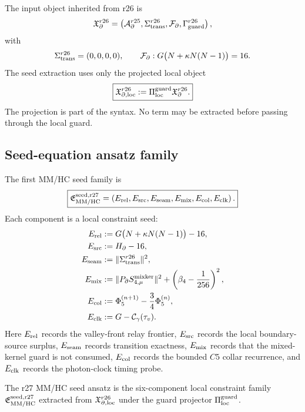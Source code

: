 The input object inherited from r26 is
\[
\mathfrak X_{\partial}^{r26}
=
\left(
\mathcal A_{\partial}^{r25},
\Sigma_{\rm trans}^{r26},
\mathcal F_{\partial},
\Gamma_{\rm guard}^{r26}
\right),
\]
with
\[
\Sigma_{\rm trans}^{r26}=(0,0,0,0),
\qquad
\mathcal F_{\partial}:G\bigl(N+\kappa N(N-1)\bigr)=16.
\]
The seed extraction uses only the projected local object
\[
\boxed{
\mathfrak X_{\partial,\rm loc}^{r26}
:=
\Pi_{\rm loc}^{\rm guard}\mathfrak X_{\partial}^{r26}.
}
\]
The projection is part of the syntax.  No term may be extracted before passing
through the local guard.

\subsection{Seed-equation ansatz family}
\label{subsec:v470-r27-seed-equation-ansatz-family}

The first MM/HC seed family is
\[
\boxed{
\mathfrak E_{\rm MM/HC}^{\rm seed,r27}
=
\left(
E_{\rm rel},
E_{\rm src},
E_{\rm seam},
E_{\rm mix},
E_{\rm col},
E_{\rm clk}
\right).
}
\]
Each component is a local constraint seed:
\[
\begin{aligned}
E_{\rm rel}&:=G\bigl(N+\kappa N(N-1)\bigr)-16,\\
E_{\rm src}&:=H_{\partial}-16,\\
E_{\rm seam}&:=\|\Sigma_{\rm trans}^{r26}\|^2,\\
E_{\rm mix}&:=\|P_{\partial}S_{4,\mu}^{\rm mixker}\|^2+\left(\beta_4-\frac1{256}\right)^2,\\
E_{\rm col}&:=\Phi_5^{(n+1)}-\frac34\Phi_5^{(n)},\\
E_{\rm clk}&:=G-\mathcal C_{\gamma}(\tau_v).
\end{aligned}
\]
Here \(E_{\rm rel}\) records the valley-front relay frontier, \(E_{\rm src}\)
records the local boundary-source surplus, \(E_{\rm seam}\) records transition
exactness, \(E_{\rm mix}\) records that the mixed-kernel guard is not consumed,
\(E_{\rm col}\) records the bounded \(C5\) collar recurrence, and
\(E_{\rm clk}\) records the photon-clock timing probe.

\begin{definition}
\label{def:v470-r27-mmhc-seed-ansatz}
The r27 MM/HC seed ansatz is the six-component local constraint family
\(\mathfrak E_{\rm MM/HC}^{\rm seed,r27}\) extracted from
\(\mathfrak X_{\partial,\rm loc}^{r26}\) under the guard projector
\(\Pi_{\rm loc}^{\rm guard}\).
\end{definition}

